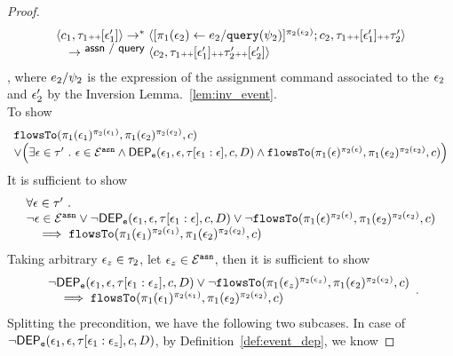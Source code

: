 \begin{proof}
\[\begin{array}{l}
		\langle c_1, \mathtt{\tau}_1 {\scriptscriptstyle ++} [\mathtt{\epsilon}_1'] \rangle \rightarrow^{*} \langle [\mathrel{ \pi_1(\mathtt{\epsilon}_2) \leftarrow e_2 / {\tt query}(\psi_2) }]{}^{\pi_2(\mathtt{\epsilon}_2)};c_2, \mathtt{\tau}_1 {\scriptscriptstyle ++} [\mathtt{\epsilon}_1'] {\scriptscriptstyle ++} \mathtt{\tau}_2' \rangle 
		\\ \quad
		\rightarrow^{\textsf{\small{ assn / query}}} \langle c_2, \mathtt{\tau}_1 {\scriptscriptstyle ++} [\mathtt{\epsilon}_1'] {\scriptscriptstyle ++} \mathtt{\tau}_2' {\scriptscriptstyle ++} [\mathtt{\epsilon}_2'] \rangle 
	\end{array}
\]
, where $e_2 / \psi_2$ is the expression of the assignment command associated to the $\mathtt{\epsilon}_2$ and $\mathtt{\epsilon}_2'$ by the Inversion Lemma.~\ref{lem:inv_event}.
\\
To show
\[
	\begin{array}{l}
		\mathtt{flowsTo}(\pi_1(\mathtt{\epsilon}_1)^{\pi_2(\mathtt{\epsilon}_1)}, \pi_1(\mathtt{\epsilon}_2)^{\pi_2(\mathtt{\epsilon}_2)}, c)
		\\ \lor
		\Big( 
		\exists \mathtt{\epsilon} \in \mathtt{\tau}' ~.~  
		\mathtt{\epsilon} \in \mathcal{E}^{\mathtt{{asn}}} \land
			\mathsf{DEP_{\mathtt{e}}}(\mathtt{\epsilon}_1, \mathtt{\epsilon}, \mathtt{\tau}[\mathtt{\epsilon}_1:\mathtt{\epsilon}], c, D)
			\land 
			\mathtt{flowsTo}(\pi_1(\mathtt{\epsilon})^{\pi_2(\mathtt{\epsilon})}, \pi_1(\mathtt{\epsilon}_2)^{\pi_2(\mathtt{\epsilon}_2)}, c)
		\Big) 
	\end{array}
	\]
It is sufficient to show
\[
	\begin{array}{l}
		\forall \mathtt{\epsilon} \in \mathtt{\tau}' ~.~  
		\\
		\neg \mathtt{\epsilon} \in \mathcal{E}^{\mathtt{{asn}}} \lor
			\neg \mathsf{DEP_{\mathtt{e}}}(\mathtt{\epsilon}_1, \mathtt{\epsilon}, \mathtt{\tau}[\mathtt{\epsilon}_1:\mathtt{\epsilon}], c, D)
			\lor 
			\neg 
				\mathtt{flowsTo}(\pi_1(\mathtt{\epsilon})^{\pi_2(\mathtt{\epsilon})}, \pi_1(\mathtt{\epsilon}_2)^{\pi_2(\mathtt{\epsilon}_2)}, c)
		\\ \quad 
		\implies 
		\mathtt{flowsTo}(\pi_1(\mathtt{\epsilon}_1)^{\pi_2(\mathtt{\epsilon}_1)}, \pi_1(\mathtt{\epsilon}_2)^{\pi_2(\mathtt{\epsilon}_2)}, c)
	\end{array}
	\]
Taking arbitrary $\mathtt{\epsilon}_z \in \mathtt{\tau}_2$, let $\mathtt{\epsilon}_z \in \mathcal{E}^{\mathtt{{asn}}}$, then it is sufficient to show
\[
\begin{array}{l}
	\neg \mathsf{DEP_{\mathtt{e}}}(\mathtt{\epsilon}_1, \mathtt{\epsilon}, \mathtt{\tau}[\mathtt{\epsilon}_1:\mathtt{\epsilon}_z], c, D)
	\lor  \neg \mathtt{flowsTo}(\pi_1(\mathtt{\epsilon}_z)^{\pi_2(\mathtt{\epsilon}_z)}, \pi_1(\mathtt{\epsilon}_2)^{\pi_2(\mathtt{\epsilon}_2)}, c)
	\\ \quad 
	\implies 
	\mathtt{flowsTo}(\pi_1(\mathtt{\epsilon}_1)^{\pi_2(\mathtt{\epsilon}_1)}, \pi_1(\mathtt{\epsilon}_2)^{\pi_2(\mathtt{\epsilon}_2)}, c)
\end{array}
.
\]
Splitting the precondition, we have the following two subcases.
In case of $\neg \mathsf{DEP_{\mathtt{e}}}(\mathtt{\epsilon}_1, \mathtt{\epsilon}, \mathtt{\tau}[\mathtt{\epsilon}_1:\mathtt{\epsilon}_z], c, D)$,
by Definition~\ref{def:event_dep}, we know 

\end{proof}

